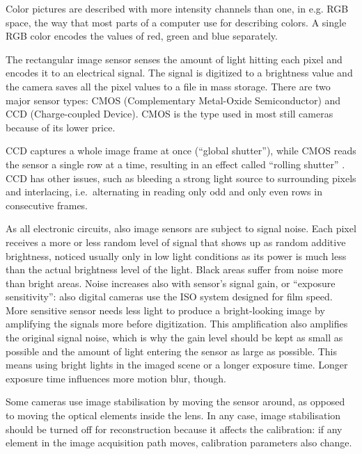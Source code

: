 Color pictures are described with more intensity channels than one, in e.g. RGB space, the way that most parts of a computer use for describing colors.
A single RGB color encodes the values of red, green and blue separately.


The rectangular image sensor senses the amount of light hitting each pixel and encodes it to an electrical signal.
The signal is digitized to a brightness value and the camera saves all the pixel values to a file in mass storage.
There are two major sensor types: CMOS (Complementary Metal-Oxide Semiconductor) and CCD (Charge-coupled Device).
CMOS is the type used in most still cameras because of its lower price.

CCD captures a whole image frame at once (``global shutter''), while CMOS reads the sensor a single row at a time, resulting in an effect called ``rolling shutter'' \cite{todo:cmos}.
CCD has other issues, such as bleeding a strong light source to surrounding pixels and interlacing, i.e.~alternating in reading only odd and only even rows in consecutive frames.


As all electronic circuits, also image sensors are subject to signal noise.
Each pixel receives a more or less random level of signal that shows up as random additive brightness, noticed usually only in low light conditions as its power is much less than the actual brightness level of the light.
Black areas suffer from noise more than bright areas.
Noise increases also with sensor's signal gain, or ``exposure sensitivity'': also digital cameras use the ISO system designed for film speed.
More sensitive sensor needs less light to produce a bright-looking image by amplifying the signals more before digitization.
This amplification also amplifies the original signal noise, which is why the gain level should be kept as small as possible and the amount of light entering the sensor as large as possible.
This means using bright lights in the imaged scene or a longer exposure time.
Longer exposure time influences more motion blur, though.


Some cameras use image stabilisation by moving the sensor around, as opposed to moving the optical elements inside the lens.
In any case, image stabilisation should be turned off for reconstruction because it affects the calibration: if any element in the image acquisition path moves, calibration parameters also change.

